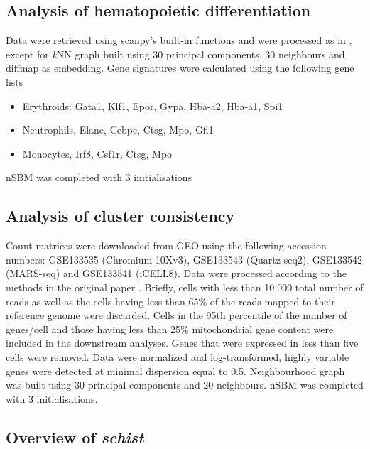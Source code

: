 \documentclass[10pt,letterpaper]{article}
\begin{document}
\subsection*{Analysis of hematopoietic differentiation}

Data were retrieved using scanpy's built-in functions and were processed as in \cite{wolf_2019}, except for \emph{k}NN graph built using 30 principal components, 30 neighbours and diffmap as embedding. Gene signatures were calculated using the following gene lists
\begin{itemize}
\item Erythroids: Gata1, Klf1, Epor, Gypa, Hba-a2, Hba-a1, Spi1
\item Neutrophils, Elane, Cebpe, Ctsg, Mpo, Gfi1
\item Monocytes, Irf8, Csf1r, Ctsg, Mpo
\end{itemize}

nSBM was completed with 3 initialisations

\subsection*{Analysis of cluster consistency}

Count matrices were downloaded from GEO using the following accession numbers: GSE133535 (Chromium 10Xv3), GSE133543 (Quartz-seq2), GSE133542 (MARS-seq) and GSE133541 (iCELL8). Data were processed according to the methods in the original paper \cite{mereu_2020}. Briefly, cells with less than 10,000 total number of reads as well as the cells having less than 65\% of the reads mapped to their reference genome were discarded. Cells in the 95th percentile of the number of genes/cell and those having less than 25\% mitochondrial gene content were included in the downstream analyses. Genes that were expressed in less than five cells were removed. Data were normalized and log-transformed, highly variable genes were detected at minimal dispersion equal to 0.5. Neighbourhood graph was built using 30 principal components and 20 neighbours. nSBM was completed with 3 initialisations. 

\subsection*{Overview of \emph{schist}}
\end{document}
